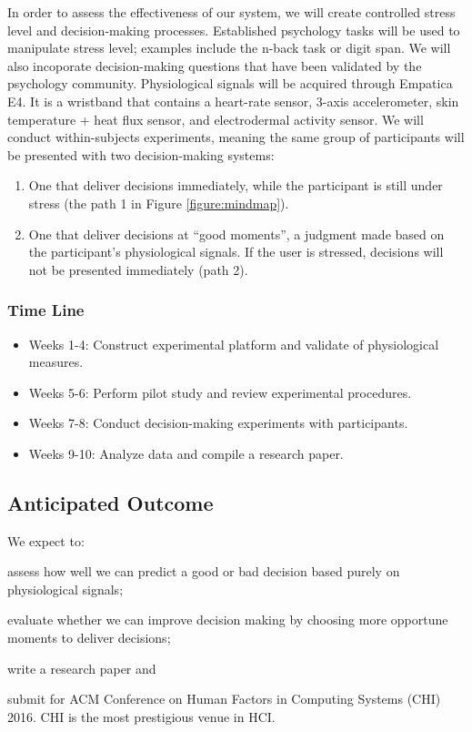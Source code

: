 \documentclass[12pt]{article}
\begin{document}
In order to assess the effectiveness of our system, we will create controlled stress level and decision-making processes. Established psychology tasks will be used to manipulate stress level; examples include the n-back task or digit span. We will also incoporate decision-making questions that have been validated by the psychology community. Physiological signals will be acquired through Empatica E4. It is a wristband that contains a heart-rate sensor, 3-axis accelerometer, skin temperature + heat flux sensor, and electrodermal activity sensor. We will conduct within-subjects experiments, meaning the same group of participants will be presented with two decision-making systems:
\begin{enumerate}
\itemsep1pt\parskip0pt
\item One that deliver decisions immediately, while the participant is still under stress (the path 1 in Figure \ref{figure:mindmap}). 
\item One that deliver decisions at ``good moments'', a judgment made based on the participant's physiological signals. If the user is stressed, decisions will not be presented immediately (path 2).
\end{enumerate}



\subsubsection{Time Line}
\begin{itemize} 
\itemsep0pt\parskip0pt
\item Weeks 1-4: Construct experimental platform and validate of physiological measures.
\item Weeks 5-6: Perform pilot study and review experimental procedures.
\item Weeks 7-8: Conduct decision-making experiments with participants.
\item Weeks 9-10: Analyze data and compile a research paper.
\end{itemize}


\subsection{Anticipated Outcome}\label{anticipated-outcome}
We expect to:
\begin{inparaenum}[\itshape 1\upshape)]
\item
  assess how well we can predict a good or bad decision based purely on physiological signals;
\item 
  evaluate whether we can improve decision making by choosing more opportune moments to deliver decisions;
\item
  write a research paper and
\item
  submit for ACM Conference on Human Factors in Computing Systems (CHI) 2016. CHI is the most prestigious venue in HCI.
\end{inparaenum}
\end{document}
